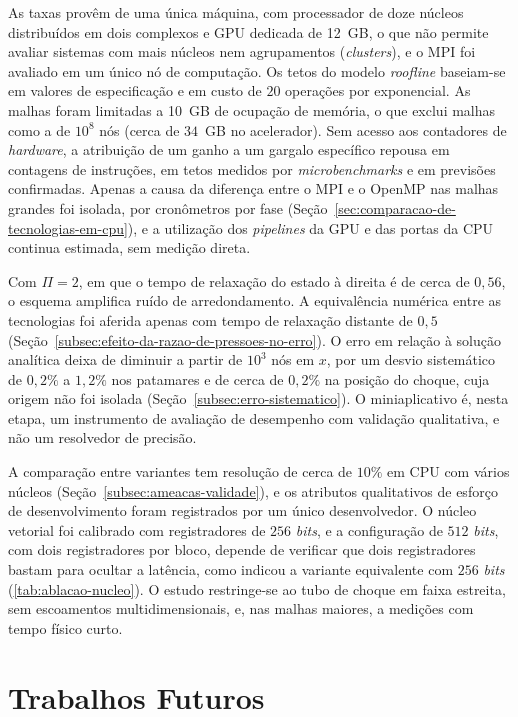 As taxas provêm de uma única máquina, com processador de doze núcleos distribuídos em dois complexos e GPU dedicada de 12~GB, o que não permite avaliar sistemas com mais núcleos nem agrupamentos (\textit{clusters}), e o MPI foi avaliado em um único nó de computação.
Os tetos do modelo \textit{roofline} baseiam-se em valores de especificação e em custo de \(20\) operações por exponencial.
As malhas foram limitadas a 10~GB de ocupação de memória, o que exclui malhas como a de \(10^8\) nós (cerca de \(34\)~GB no acelerador).
Sem acesso aos contadores de \textit{hardware}, a atribuição de um ganho a um gargalo específico repousa em contagens de instruções, em tetos medidos por \textit{microbenchmarks} e em previsões confirmadas.
Apenas a causa da diferença entre o MPI e o OpenMP nas malhas grandes foi isolada, por cronômetros por fase (Seção~\ref{sec:comparacao-de-tecnologias-em-cpu}), e a utilização dos \textit{pipelines} da GPU e das portas da CPU continua estimada, sem medição direta.

Com \(\Pi = 2\), em que o tempo de relaxação do estado à direita é de cerca de \(0{,}56\), o esquema amplifica ruído de arredondamento.
A equivalência numérica entre as tecnologias foi aferida apenas com tempo de relaxação distante de \(0{,}5\) (Seção~\ref{subsec:efeito-da-razao-de-pressoes-no-erro}).
O erro em relação à solução analítica deixa de diminuir a partir de \(10^3\) nós em \(x\), por um desvio sistemático de \(0{,}2\%\) a \(1{,}2\%\) nos patamares e de cerca de \(0{,}2\%\) na posição do choque, cuja origem não foi isolada (Seção~\ref{subsec:erro-sistematico}).
O miniaplicativo é, nesta etapa, um instrumento de avaliação de desempenho com validação qualitativa, e não um resolvedor de precisão.

A comparação entre variantes tem resolução de cerca de \(10\%\) em CPU com vários núcleos (Seção~\ref{subsec:ameacas-validade}), e os atributos qualitativos de esforço de desenvolvimento foram registrados por um único desenvolvedor.
O núcleo vetorial foi calibrado com registradores de \(256\) \textit{bits}, e a configuração de \(512\) \textit{bits}, com dois registradores por bloco, depende de verificar que dois registradores bastam para ocultar a latência, como indicou a variante equivalente com \(256\) \textit{bits} (\autoref{tab:ablacao-nucleo}).
O estudo restringe-se ao tubo de choque em faixa estreita, sem escoamentos multidimensionais, e, nas malhas maiores, a medições com tempo físico curto.

\section{Trabalhos Futuros}\label{sec:trabalhos-futuros}

